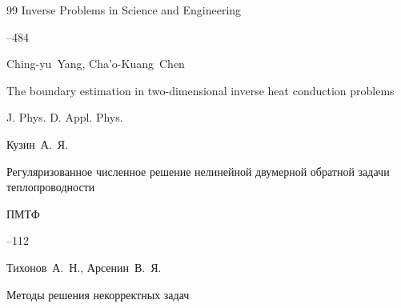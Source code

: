 \begin{thebibliography}{99}
\jour Inverse Problems in Science and Engineering




--484





\by Ching-yu~Yang, Cha'o-Kuang~Chen

\paper The boundary estimation in two-dimensional inverse heat conduction problems

\jour J. Phys. D. Appl. Phys.









\by Кузин~А.~Я.

\paper Регуляризованное численное решение нелинейной двумерной обратной задачи теплопроводности 

\jour ПМТФ



--112














\by Тихонов~А.~Н., Арсенин~В.~Я. 

\book Методы решения некорректных задач


\end{thebibliography}
